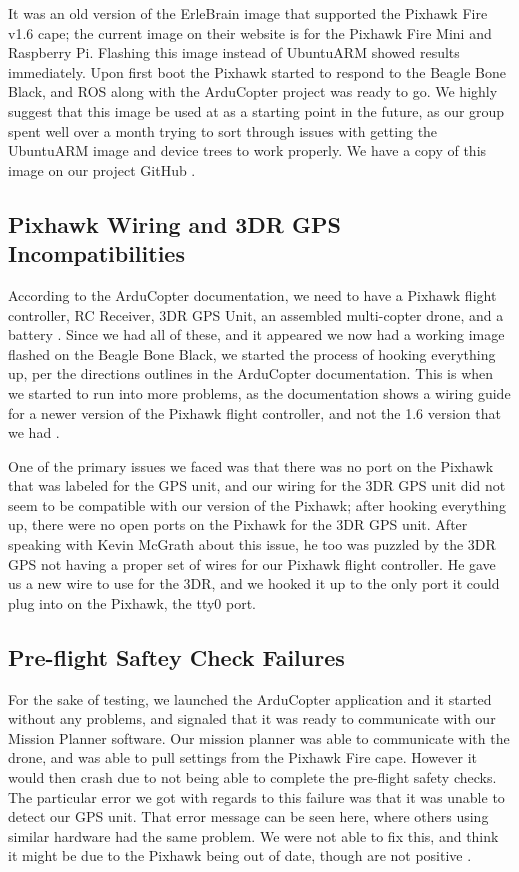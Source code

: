 \documentclass[IEEEtran,letterpaper,10pt,notitlepage,draftclsnofoot]{article}
\begin{document}
It was an old version of the ErleBrain image that supported the Pixhawk Fire v1.6 cape; the current image on
their website is for the Pixhawk Fire Mini and Raspberry Pi. Flashing this image instead of UbuntuARM showed
results immediately. Upon first boot the Pixhawk started to respond to the Beagle Bone Black, and ROS along
with the ArduCopter project was ready to go. We highly suggest that this image be used at as a starting point
in the future, as our group spent well over a month trying to sort through issues with getting the UbuntuARM
image and device trees to work properly. We have a copy of this image on our project GitHub \cite{ErleBrainAIOImage}.

\subsection{Pixhawk Wiring and 3DR GPS Incompatibilities}

According to the ArduCopter documentation, we need to have a Pixhawk flight controller, RC Receiver, 3DR GPS
Unit, an assembled multi-copter drone, and a battery \cite{ArduCopterIntro}.
Since we had all of these, and it appeared we now had a working image flashed on the Beagle Bone Black, we
started the process of hooking everything up, per the directions outlines in
the ArduCopter documentation. This is when we started to run into more problems, as the documentation shows a
wiring guide for a newer version of the Pixhawk flight controller, and not the 1.6 version that we had
\cite{ArduPixhawkWiring}.

One of the primary issues we faced was that there was no port on the Pixhawk that was labeled for the GPS
unit, and our wiring for the 3DR GPS unit did not seem to be compatible with our version of the Pixhawk; after
hooking everything up, there were no open ports on the Pixhawk for the 3DR GPS unit.
After speaking with Kevin McGrath about this issue, he too was puzzled by the 3DR GPS not having a proper
set of wires for our Pixhawk flight controller. He gave us a new wire to use for the 3DR, and we hooked it
up to the only port it could plug into on the Pixhawk, the tty0 port.


\subsection{Pre-flight Saftey Check Failures}

For the sake of testing, we launched the ArduCopter application and it started without any problems, and
signaled that it was ready to communicate with our Mission Planner software. Our mission planner was able to
communicate with the drone, and was able to pull settings from the Pixhawk Fire cape. However it would then
crash due to not being able to complete the pre-flight safety checks. The particular error we got with
regards to this failure was that it was unable to detect our GPS unit. That error message can be seen here,
where others using similar hardware had the same problem. We were not able to fix this, and think it might
be due to the Pixhawk being out of date, though are not positive \cite{3DRError} \cite{3DRError2}. 
\end{document}
